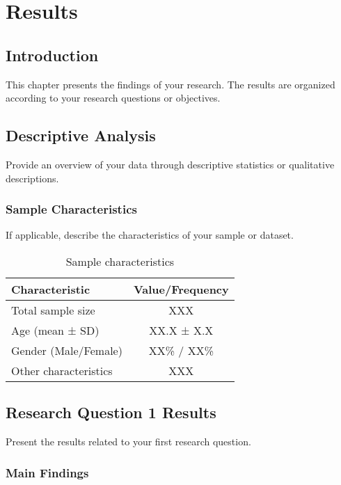 \chapter{Results}

\section{Introduction}

This chapter presents the findings of your research. The results are organized according to your research questions or objectives.

\section{Descriptive Analysis}

Provide an overview of your data through descriptive statistics or qualitative descriptions.

\subsection{Sample Characteristics}

If applicable, describe the characteristics of your sample or dataset.

\begin{table}[h]
\centering
\caption{Sample characteristics}
\label{tab:sample_characteristics}
\begin{tabular}{|l|c|}
\hline
\textbf{Characteristic} & \textbf{Value/Frequency} \\
\hline
Total sample size & XXX \\
Age (mean ± SD) & XX.X ± X.X \\
Gender (Male/Female) & XX\% / XX\% \\
Other characteristics & XXX \\
\hline
\end{tabular}
\end{table}

\section{Research Question 1 Results}

Present the results related to your first research question.

\subsection{Main Findings}

